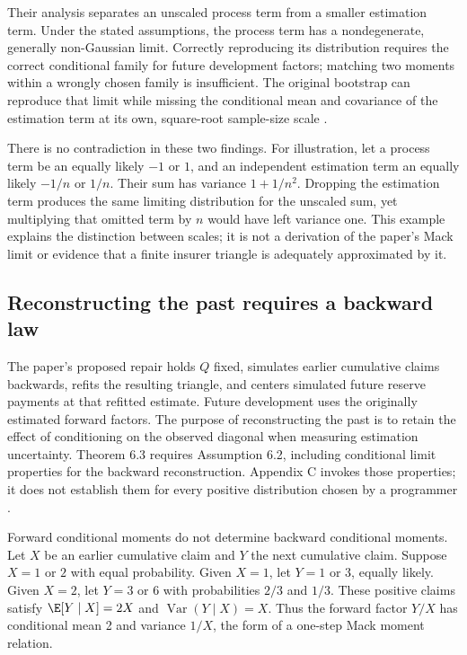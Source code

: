 Their analysis separates an unscaled process term from a smaller estimation
term. Under the stated assumptions, the process term has a nondegenerate,
generally non-Gaussian limit. Correctly reproducing its distribution requires
the correct conditional family for future development factors; matching two
moments within a wrongly chosen family is insufficient. The original
bootstrap can reproduce that limit while missing the conditional mean and
covariance of the estimation term at its own, square-root sample-size scale
\citep[Assumptions 4.6--4.9, Theorems 4.8--4.11 and Remark 4.12]{steinmetz2024bootstrap}.

There is no contradiction in these two findings. For illustration, let a
process term be an equally likely $-1$ or $1$, and an independent estimation
term an equally likely $-1/n$ or $1/n$. Their sum has variance $1+1/n^2$.
Dropping the estimation term produces the same limiting distribution for the
unscaled sum, yet multiplying that omitted term by $n$ would have left variance
one. This example explains the distinction between scales; it is not a
derivation of the paper's Mack limit or evidence that a finite insurer triangle
is adequately approximated by it.

\subsection{Reconstructing the past requires a backward law}

The paper's proposed repair holds $Q$ fixed, simulates earlier cumulative
claims backwards, refits the resulting triangle, and centers simulated future
reserve payments at that refitted estimate. Future development uses the
originally estimated forward factors. The purpose of reconstructing the past
is to retain the effect of conditioning on the observed diagonal when
measuring estimation uncertainty. Theorem 6.3 requires Assumption 6.2,
including conditional limit properties for the backward reconstruction.
Appendix C invokes those properties; it does not establish them for every
positive distribution chosen by a programmer
\citep[Section 5, Assumption 6.2 and Appendix C]{steinmetz2024bootstrap}.

Forward conditional moments do not determine backward conditional moments.
Let $X$ be an earlier cumulative claim and $Y$ the next cumulative claim.
Suppose $X=1$ or $2$ with equal probability. Given $X=1$, let $Y=1$ or $3$,
equally likely. Given $X=2$, let $Y=3$ or $6$ with probabilities $2/3$ and
$1/3$. These positive claims satisfy
$\E[Y\mid X]=2X$ and $\operatorname{Var}(Y\mid X)=X$.
Thus the forward factor $Y/X$ has conditional mean 2 and variance $1/X$,
the form of a one-step Mack moment relation.

